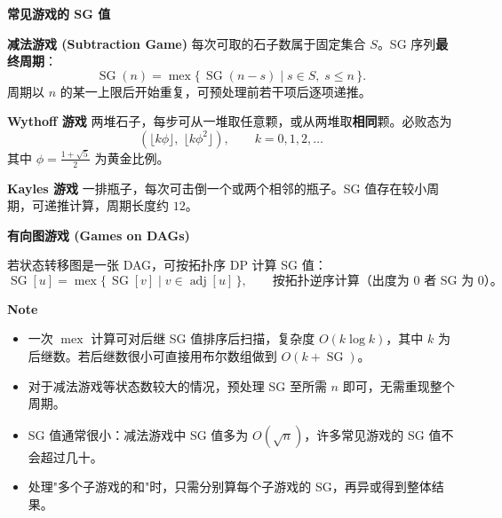 \textbf{常见游戏的 SG 值}

\textbf{减法游戏 (Subtraction Game)}
每次可取的石子数属于固定集合 $S$。SG 序列\textbf{最终周期}：
\[
\operatorname{SG}(n)=\operatorname{mex}\{\,\operatorname{SG}(n-s)\mid s\in S,\;s\le n\,\}.
\]
周期以 $n$ 的某一上限后开始重复，可预处理前若干项后逐项递推。

\textbf{Wythoff 游戏}
两堆石子，每步可从一堆取任意颗，或从两堆取\textbf{相同}颗。必败态为
\[
(\lfloor k\phi\rfloor,\;\lfloor k\phi^2\rfloor),\qquad k=0,1,2,\dots
\]
其中 $\phi=\frac{1+\sqrt5}{2}$ 为黄金比例。

\textbf{Kayles 游戏}
一排瓶子，每次可击倒一个或两个相邻的瓶子。SG 值存在较小周期，可递推计算，周期长度约 $12$。

\textbf{有向图游戏 (Games on DAGs)}

若状态转移图是一张 DAG，可按拓扑序 DP 计算 SG 值：
\[
\operatorname{SG}[u]=\operatorname{mex}\{\,\operatorname{SG}[v]\mid v\in\operatorname{adj}[u]\,\},\qquad
\text{按拓扑逆序计算（出度为 $0$ 者 SG 为 $0$）。}
\]

\textbf{Note}
\begin{itemize}
\item 一次 $\operatorname{mex}$ 计算可对后继 SG 值排序后扫描，复杂度 $O(k\log k)$，其中 $k$ 为后继数。若后继数很小可直接用布尔数组做到 $O(k+\operatorname{SG})$。
\item 对于减法游戏等状态数较大的情况，预处理 SG 至所需 $n$ 即可，无需重现整个周期。
\item SG 值通常很小：减法游戏中 SG 值多为 $O(\sqrt{n})$，许多常见游戏的 SG 值不会超过几十。
\item 处理"多个子游戏的和"时，只需分别算每个子游戏的 SG，再异或得到整体结果。
\end{itemize}

